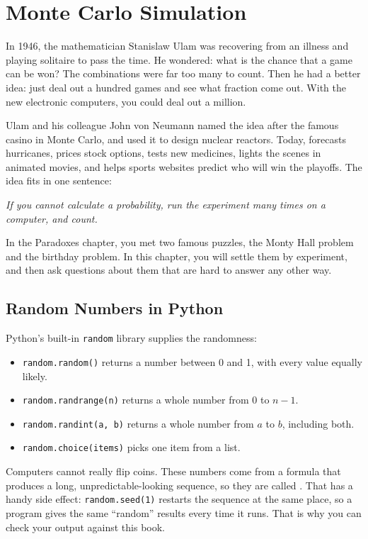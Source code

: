 \chapter{Monte Carlo Simulation}

In 1946, the mathematician Stanislaw Ulam was recovering from an illness and
playing solitaire to pass the time. He wondered: what is the chance that a game
can be won? The combinations were far too many to count. Then he had a better
idea: just deal out a hundred games and see what fraction come out. With the new
electronic computers, you could deal out a million.

Ulam and his colleague John von Neumann named the idea after the famous casino in
Monte Carlo, and used it to design nuclear reactors. Today,  forecasts hurricanes, prices stock options, tests new medicines,
lights the scenes in animated movies, and helps sports websites predict who will
win the playoffs. The idea fits in one sentence:

\begin{center}
\emph{If you cannot calculate a probability, run the experiment many times on a computer, and count.}
\end{center}

In the Paradoxes chapter, you met two famous puzzles, the Monty Hall problem and
the birthday problem. In this chapter, you will settle them by experiment, and then
ask questions about them that are hard to answer any other way.

\section{Random Numbers in Python}
Python's built-in \texttt{random} library supplies the randomness:
\begin{itemize}
\item \texttt{random.random()} returns a number between 0 and 1, with every
value equally likely.
\item \texttt{random.randrange(n)} returns a whole number from 0 to $n - 1$.
\item \texttt{random.randint(a, b)} returns a whole number from $a$ to $b$,
including both.
\item \texttt{random.choice(items)} picks one item from a list.
\end{itemize}
Computers cannot really flip coins. These numbers come from a formula that produces
a long, unpredictable-looking sequence, so they are called . That
has a handy side effect: \texttt{random.seed(1)} restarts the sequence at
the same place, so a program gives the same ``random'' results every time it runs.
That is why you can check your output against this book.

